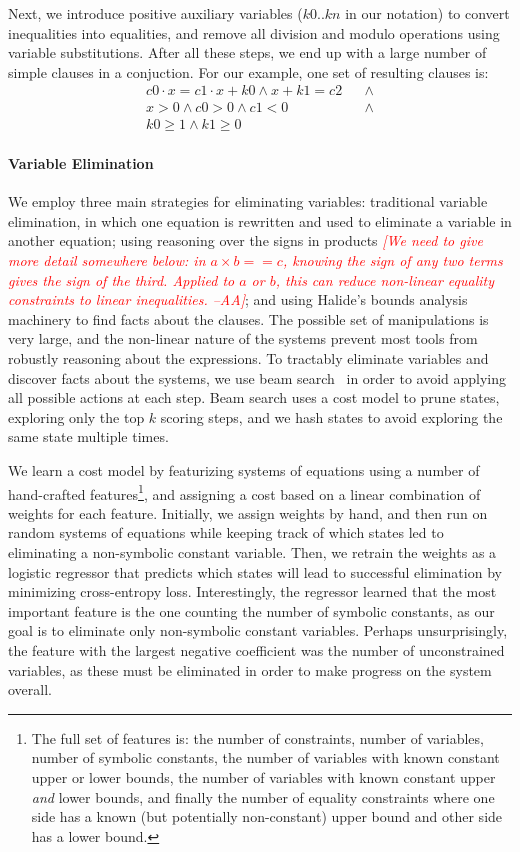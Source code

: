 \documentclass[sigplan,10pt,review,anonymous]{acmart}\settopmatter{printfolios=true,printccs=false,printacmref=false}
\newcommand{\aba}[1]{\textcolor{red}{\textit{[{#1} --AA]}}}
\begin{document}
Next, we introduce positive auxiliary variables ($k0..kn$ in our notation) to convert
inequalities into equalities, and remove all division and modulo operations using
variable substitutions.  After all these steps, we end up with a large number of simple
clauses in a conjuction.  For our example, one set of resulting clauses is:
\begin{align*}
c0 \cdot x = c1 \cdot x + k0  \wedge x + k1 = c2 & & \wedge \\
x > 0 \wedge
c0 > 0 \wedge 
c1 < 0 & & \wedge  \\
k0 \geq 1 \wedge k1 \geq 0 & &
\end{align*}

\paragraph{Variable Elimination} We employ three main strategies for eliminating
variables: traditional variable elimination, in which one equation is rewritten and
used to eliminate a variable in another equation; using reasoning over the signs in products \aba{We need to give more detail somewhere below: in $a \times b == c$, knowing the sign of any two terms gives the sign of the third. Applied to $a$ or $b$, this can reduce non-linear equality constraints to linear inequalities.};
and using Halide's bounds analysis machinery to find facts about the clauses.  The possible
set of manipulations is very large, and the non-linear nature of the systems prevent most
tools from robustly reasoning about the expressions.  To tractably eliminate variables and discover
facts about the systems, we use beam search~\cite{beamsearch} in order to avoid applying
all possible actions at each step.  Beam search uses a cost model to prune states, exploring
only the top $k$ scoring steps, and we hash states to avoid exploring the same state multiple
times.

We learn a cost model by featurizing systems of equations using a number of hand-crafted
features\footnote{The full set of features is: the number of constraints, number of variables,
  number of symbolic constants, the number of variables with known constant upper or lower bounds,
  the number of variables with known constant upper \textit{and} lower bounds, and finally the number of
  equality constraints where one side has a known (but potentially non-constant) upper bound and other side has a lower bound.},
and assigning a cost based on a linear combination of weights for each feature.  Initially,
we assign weights by hand, and then run on random systems of equations while keeping track
of which states led to eliminating a non-symbolic constant variable.  Then, we retrain the weights
as a logistic regressor that predicts which states will lead to successful elimination
by minimizing cross-entropy loss.  Interestingly, the regressor learned that the most
important feature is the one counting the number of symbolic constants, as our goal
is to eliminate only non-symbolic constant variables.  Perhaps unsurprisingly, the feature
with the largest negative coefficient was the number of unconstrained variables, as
these must be eliminated in order to make progress on the system overall.
\end{document}

